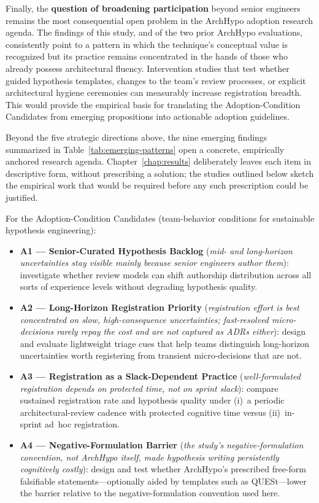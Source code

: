 Finally, the \textbf{question of broadening participation} beyond senior engineers
remains the most consequential open problem in the ArchHypo adoption research agenda.
The findings of this study, and of the two prior ArchHypo evaluations, consistently
point to a pattern in which the technique's conceptual value is recognized but its
practice remains concentrated in the hands of those who already possess architectural
fluency. Intervention studies that test whether guided hypothesis templates, changes
to the team's review processes, or explicit architectural hygiene ceremonies can measurably increase
registration breadth. This would provide the empirical basis for translating the
Adoption-Condition Candidates from emerging propositions into actionable adoption guidelines.

Beyond the five strategic directions above, the nine emerging findings summarized
in Table~\ref{tab:emerging-patterns} open a concrete, empirically anchored research
agenda. Chapter~\ref{chap:results} deliberately leaves each item
in descriptive form, without prescribing a solution; the studies outlined below
sketch the empirical work that would be required before any such prescription
could be justified.

For the Adoption-Condition Candidates (team-behavior conditions for sustainable hypothesis
engineering):

\begin{itemize}
  \item \textbf{A1 --- Senior-Curated Hypothesis Backlog}
    (\emph{mid- and long-horizon uncertainties stay visible mainly because
    senior engineers author them}): investigate whether review models can shift
    authorship distribution across all sorts of experience levels without degrading
    hypothesis quality.
  \item \textbf{A2 --- Long-Horizon Registration Priority}
    (\emph{registration effort is best concentrated on slow, high-consequence
    uncertainties; fast-resolved micro-decisions rarely repay the cost and are
    not captured as ADRs either}): design and evaluate lightweight triage cues
    that help teams distinguish long-horizon uncertainties worth registering
    from transient micro-decisions that are not.
  \item \textbf{A3 --- Registration as a Slack-Dependent Practice}
    (\emph{well-formulated registration depends on protected time, not on
    sprint slack}): compare sustained registration rate and hypothesis
    quality under (i)~a periodic architectural-review cadence with protected
    cognitive time versus (ii)~in-sprint ad~hoc registration.
  \item \textbf{A4 --- Negative-Formulation Barrier}
    (\emph{the study's negative-formulation convention, not ArchHypo itself, made
    hypothesis writing persistently cognitively costly}): design and test whether
    ArchHypo's prescribed free-form falsifiable statements---optionally aided by
    templates such as QUESt---lower the barrier relative to the negative-formulation
    convention used here.
\end{itemize}

